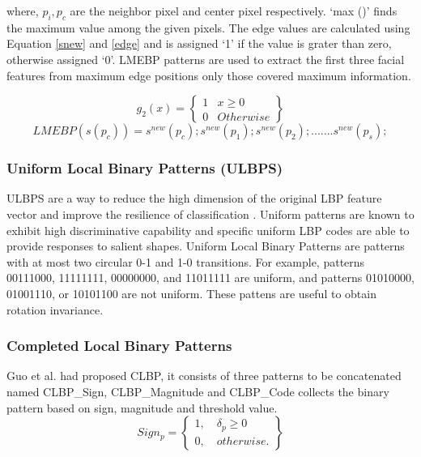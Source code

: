 where, $p_i, p_c$ are the neighbor pixel and center pixel respectively. ‘max ()’ finds the maximum value among the given pixels. The edge values are calculated using Equation \ref{snew} and \ref{edge} and is assigned ‘1’ if the value is grater than zero, otherwise assigned ‘0’. LMEBP ﻿patterns ﻿are ﻿used ﻿to ﻿extract ﻿the ﻿first ﻿three ﻿facial ﻿features ﻿from ﻿maximum ﻿edge ﻿positions only ﻿those ﻿covered maximum ﻿information.

\begin{equation}
g_2(x)=\left\{\begin{array}{cl} 1 &  x \ge 0 \\ 0 & Otherwise \end{array}\right\}
\label{edge}
\end{equation}
\begin{equation}
LMEBP(s(p_c))={s^{new}(p_c); s^{new}(p_1);s^{new}(p_2);....... s^{new}(p_s); }
\label{lmebpEq3}
\end{equation}


\subsubsection{Uniform Local Binary Patterns (ULBPS)}
ULBPS are a way to reduce the high dimension of the original LBP feature vector and improve the resilience of classification \cite{pietikainen2000rotation}. Uniform patterns are known to exhibit high discriminative capability and specific uniform LBP codes are able to provide responses to salient shapes. Uniform Local Binary Patterns are patterns with at most two circular 0-1 and 1-0 transitions. For example, patterns 00111000, 11111111, 00000000, and 11011111 are uniform, and patterns 01010000, 01001110, or 10101100 are not uniform. These pattens are useful to obtain rotation invariance.

\subsubsection{Completed Local Binary Patterns}
Guo et al. \cite{guo2010completed} had proposed CLBP, it consists of three patterns to be concatenated named CLBP\_Sign, CLBP\_Magnitude and CLBP\_Code collects the binary pattern based on sign, magnitude and threshold value.
\begin{equation}
Sign_p= \left\{\begin{array}{l} 1, \quad \delta_p \ge 0\\ 0, \quad otherwise. \end{array} \right\}
\end{equation}

